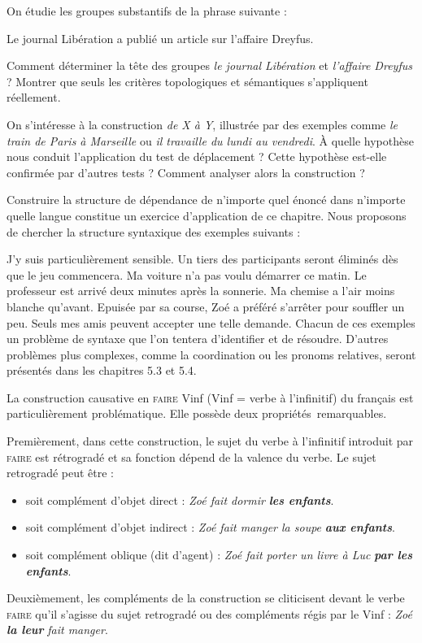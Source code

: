 {     On étudie les groupes substantifs de la phrase suivante :

    \ea
    {Le journal Libération a publié un article sur l’affaire Dreyfus}.
    \z

    Comment déterminer la tête des groupes \textit{le journal Libération} et \textit{l’affaire Dreyfus} ? Montrer que seuls les critères topologiques et sémantiques s’appliquent réellement.

     On s’intéresse à la construction \textit{de X à Y}, illustrée par des exemples comme \textit{le train de Paris à Marseille} ou \textit{il travaille du lundi au vendredi}. À quelle hypothèse nous conduit l’application du test de déplacement ? Cette hypothèse est-elle confirmée par d’autres tests ? Comment analyser alors la construction ?

     Construire la structure de dépendance de n’importe quel énoncé dans n’importe quelle langue constitue un exercice d’application de ce chapitre. Nous proposons de chercher la structure syntaxique des exemples suivants :

    \ea
        \ea
        J’y suis particulièrement sensible.
        \ex     Un tiers des participants seront éliminés dès que le jeu commencera.
        \ex     Ma voiture n’a pas voulu démarrer ce matin.
        \ex     Le professeur est arrivé deux minutes après la sonnerie.
        \ex     Ma chemise a l’air moins blanche qu’avant.
        \ex     Epuisée par sa course, Zoé a préféré s’arrêter pour souffler un peu.
        \ex     Seuls mes amis peuvent accepter une telle demande.
        \z
    \z
    Chacun de ces exemples un problème de syntaxe que l’on tentera d’identifier et de résoudre. D’autres problèmes plus complexes, comme la coordination ou les pronoms relatives, seront présentés dans les chapitres 5.3 et 5.4.

     La construction causative en \textsc{faire} Vinf (Vinf = verbe à l’infinitif) du français est particulièrement problématique. Elle possède deux propriétés~remarquables.

    Premièrement, dans cette construction, le sujet du verbe à l’infinitif introduit par \textsc{faire} est rétrogradé et sa fonction dépend de la valence du verbe. Le sujet retrogradé peut être :
    \begin{itemize}
    \item  soit complément d’objet direct : \textit{Zoé fait dormir} \textbf{\textit{les enfants}}.
    \item  soit complément d’objet indirect : \textit{Zoé fait manger la soupe} \textbf{\textit{aux enfants}}.
    \item  soit complément oblique (dit d’agent) : \textit{Zoé fait porter un livre à Luc} \textbf{\textit{par les enfants}}.
    \end{itemize}
    Deuxièmement, les compléments de la construction se cliticisent devant le verbe \textsc{faire} qu’il s’agisse du sujet retrogradé ou des compléments régis par le Vinf : \textit{Zoé} \textbf{\textit{la leur}} \textit{fait manger}.

}
